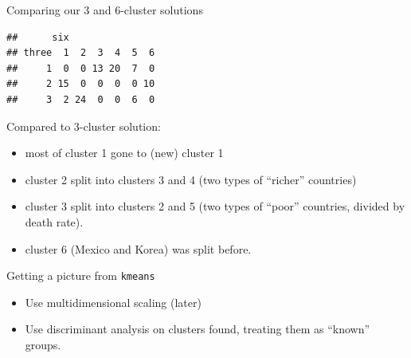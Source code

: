 \documentclass[
  ignorenonframetext,
]{beamer}
\newenvironment{Shaded}{\begin{snugshade}}{\end{snugshade}}
\newcommand{\DataTypeTok}[1]{\textcolor[rgb]{0.13,0.29,0.53}{#1}}
\newcommand{\KeywordTok}[1]{\textcolor[rgb]{0.13,0.29,0.53}{\textbf{#1}}}
\newcommand{\NormalTok}[1]{#1}
\newcommand{\OperatorTok}[1]{\textcolor[rgb]{0.81,0.36,0.00}{\textbf{#1}}}
\begin{document}
\begin{frame}[fragile]{Comparing our 3 and 6-cluster solutions}
\protect\hypertarget{comparing-our-3-and-6-cluster-solutions}{}

\begin{Shaded}
\end{Shaded}

\begin{verbatim}
##      six
## three  1  2  3  4  5  6
##     1  0  0 13 20  7  0
##     2 15  0  0  0  0 10
##     3  2 24  0  0  6  0
\end{verbatim}

Compared to 3-cluster solution:

\begin{itemize}
\item
  most of cluster 1 gone to (new) cluster 1
\item
  cluster 2 split into clusters 3 and 4 (two types of ``richer''
  countries)
\item
  cluster 3 split into clusters 2 and 5 (two types of ``poor''
  countries, divided by death rate).
\item
  cluster 6 (Mexico and Korea) was split before.
\end{itemize}

\end{frame}

\begin{frame}{Getting a picture from \texttt{kmeans}}
\protect\hypertarget{getting-a-picture-from-kmeans}{}

\begin{itemize}
\item
  Use multidimensional scaling (later)
\item
  Use discriminant analysis on clusters found, treating them as
  ``known'' groups.
\end{itemize}

\end{frame}
\end{document}
